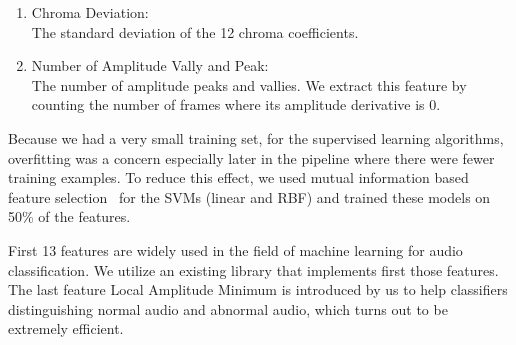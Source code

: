 \begin{enumerate}
	\item Chroma Deviation:\\
	The standard deviation of the 12 chroma coefficients.~\cite{b5}
	\item Number of Amplitude Vally and Peak:\\
	The number of amplitude peaks and vallies. We extract this feature by counting the number of frames where its amplitude derivative is 0. %
\end{enumerate}
Because we had a very small training set, for the supervised learning algorithms, overfitting was a concern especially later in the pipeline where there were fewer training examples. To reduce this effect, we used mutual information based feature selection~\cite{b25} for the SVMs (linear and RBF) and trained these models on 50\% of the features.

First 13 features are widely used in the field of machine learning for audio classification\cite{b26}\cite{b27}. We utilize an existing library\cite{b6} that implements first those features. The last feature Local Amplitude Minimum is introduced by us to help classifiers distinguishing normal audio and abnormal audio, which turns out to be extremely efficient.